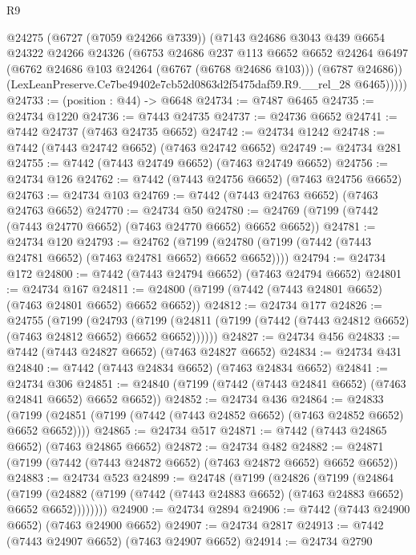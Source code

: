 \begin{lexlean}{R9}
\begin{coremodule}
          @24275
          (@6727 (@7059 @24266 @7339))
          (@7143
            @24686
            @3043
            @439
            @6654
            @24322
            @24266
            @24326
            (@6753
              @24686
              @237
              @113
              @6652
              @6652
              @24264
              @6497
              (@6762 @24686 @103 @24264 (@6767 (@6768 @24686 @103)))
              (@6787 @24686))
            (LexLeanPreserve.Ce7be49402e7cb52d0863d2f5475daf59.R9.__rel_28 @6465)))))
@24733 := (position : @44) -> @6648
@24734 := @7487 @6465
@24735 := @24734 @1220
@24736 := @7443 @24735
@24737 := @24736 @6652
@24741 := @7442 @24737 (@7463 @24735 @6652)
@24742 := @24734 @1242
@24748 := @7442 (@7443 @24742 @6652) (@7463 @24742 @6652)
@24749 := @24734 @281
@24755 := @7442 (@7443 @24749 @6652) (@7463 @24749 @6652)
@24756 := @24734 @126
@24762 := @7442 (@7443 @24756 @6652) (@7463 @24756 @6652)
@24763 := @24734 @103
@24769 := @7442 (@7443 @24763 @6652) (@7463 @24763 @6652)
@24770 := @24734 @50
@24780 := @24769 (@7199 (@7442 (@7443 @24770 @6652) (@7463 @24770 @6652) @6652 @6652))
@24781 := @24734 @120
@24793 := @24762
    (@7199 (@24780 (@7199 (@7442 (@7443 @24781 @6652) (@7463 @24781 @6652) @6652 @6652))))
@24794 := @24734 @172
@24800 := @7442 (@7443 @24794 @6652) (@7463 @24794 @6652)
@24801 := @24734 @167
@24811 := @24800 (@7199 (@7442 (@7443 @24801 @6652) (@7463 @24801 @6652) @6652 @6652))
@24812 := @24734 @177
@24826 := @24755
    (@7199
      (@24793
        (@7199 (@24811 (@7199 (@7442 (@7443 @24812 @6652) (@7463 @24812 @6652) @6652 @6652))))))
@24827 := @24734 @456
@24833 := @7442 (@7443 @24827 @6652) (@7463 @24827 @6652)
@24834 := @24734 @431
@24840 := @7442 (@7443 @24834 @6652) (@7463 @24834 @6652)
@24841 := @24734 @306
@24851 := @24840 (@7199 (@7442 (@7443 @24841 @6652) (@7463 @24841 @6652) @6652 @6652))
@24852 := @24734 @436
@24864 := @24833
    (@7199 (@24851 (@7199 (@7442 (@7443 @24852 @6652) (@7463 @24852 @6652) @6652 @6652))))
@24865 := @24734 @517
@24871 := @7442 (@7443 @24865 @6652) (@7463 @24865 @6652)
@24872 := @24734 @482
@24882 := @24871 (@7199 (@7442 (@7443 @24872 @6652) (@7463 @24872 @6652) @6652 @6652))
@24883 := @24734 @523
@24899 := @24748
    (@7199
      (@24826
        (@7199
          (@24864
            (@7199
              (@24882 (@7199 (@7442 (@7443 @24883 @6652) (@7463 @24883 @6652) @6652 @6652))))))))
@24900 := @24734 @2894
@24906 := @7442 (@7443 @24900 @6652) (@7463 @24900 @6652)
@24907 := @24734 @2817
@24913 := @7442 (@7443 @24907 @6652) (@7463 @24907 @6652)
@24914 := @24734 @2790

\end{coremodule}
\end{lexlean}
